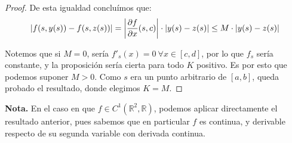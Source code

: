 \begin{ejer}
\begin{proof}
De esta igualdad concluímos que: $$|f(s,y(s)) - f(s,z(s))| = \left|\pder[f]{x}(s,c)\right|\cdot|y(s)-z(s)| \le M\cdot|y(s)-z(s)|$$

Notemos que si $M=0$, sería $f'_s(x) = 0 \ \forall x \in [c,d]$, por lo que $f_s$ sería constante, y la proposición sería cierta para todo $K$ positivo. Es por esto que podemos suponer $M > 0$. Como $s$ era un punto arbitrario de $[a,b]$, queda probado el resultado, donde elegimos $K=M$.
\end{proof}

\textbf{Nota.} En el caso en que $f \in C^1(\mathbb{R}^2,\mathbb{R})$, podemos aplicar directamente el resultado anterior, pues sabemos que en particular $f$ es continua, y derivable respecto de su segunda variable con derivada continua.

\end{ejer}
